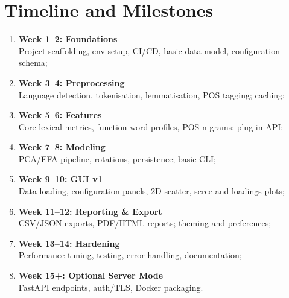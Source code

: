 \section{Timeline and Milestones}
\begin{enumerate}
    \item \textbf{Week 1--2: Foundations} \\
          Project scaffolding, env setup, CI/CD, basic data model, configuration schema;
    \item \textbf{Week 3--4: Preprocessing} \\
          Language detection, tokenisation, lemmatisation, POS tagging; caching;
    \item \textbf{Week 5--6: Features} \\
          Core lexical metrics, function word profiles, POS n-grams; plug-in API;
    \item \textbf{Week 7--8: Modeling} \\
          PCA/EFA pipeline, rotations, persistence; basic CLI;
    \item \textbf{Week 9--10: GUI v1} \\
          Data loading, configuration panels, 2D scatter, scree and loadings plots;
    \item \textbf{Week 11--12: Reporting \& Export} \\
          CSV/JSON exports, PDF/HTML reports; theming and preferences;
    \item \textbf{Week 13--14: Hardening} \\
          Performance tuning, testing, error handling, documentation;
    \item \textbf{Week 15+: Optional Server Mode} \\
          FastAPI endpoints, auth/TLS, Docker packaging.
\end{enumerate}
